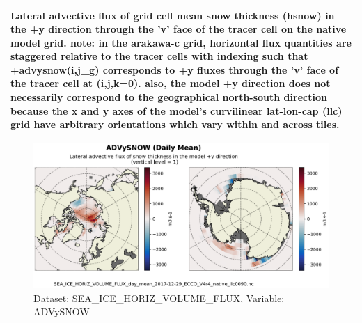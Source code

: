 \begin{longtable}{|m{}|m{}|m{}|m{}|}
\multicolumn{4}{|p{1\textwidth}|}{\footnotesize{{Lateral advective flux of grid cell mean snow thickness (hsnow) in the +y direction through the 'v' face of the tracer cell on the native model grid. note: in the arakawa-c grid, horizontal flux quantities are staggered relative to the tracer cells with indexing such that +advysnow(i,j\_g) corresponds to +y fluxes through the 'v' face of the tracer cell at (i,j,k=0). also, the model +y direction does not necessarily correspond to the geographical north-south direction because the x and y axes of the model's curvilinear lat-lon-cap (llc) grid have arbitrary orientations which vary within and across tiles.}}} \\ \hline
\end{longtable}

\begin{figure}[H]
\centering
\includegraphics[scale=0.55]{../images/plots/native_plots/Sea-Ice_and_Snow_Horizontal_Volume_Fluxes/ADVySNOW.png}
\caption{Dataset: SEA\_ICE\_HORIZ\_VOLUME\_FLUX, Variable: ADVySNOW}
\label{tab:table-SEA_ICE_HORIZ_VOLUME_FLUX_ADVySNOW-Plot}
\end{figure}
\newpage
\pagebreak
